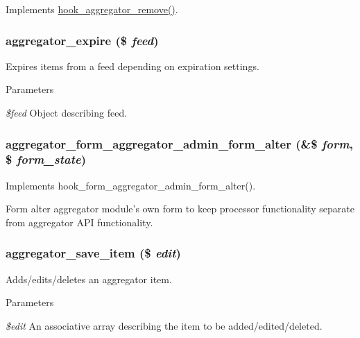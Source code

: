 \label{aggregator_8processor_8inc_a6e778e5eb28b433bc6f2cf8899984117}
Implements \hyperlink{group__hooks_gaf2f3e401371efb540b050208df5400eb}{hook\_\-aggregator\_\-remove()}. \hypertarget{aggregator_8processor_8inc_a09415d645937cbfa93210e3ead048c95}{
\subsubsection[{aggregator\_\-expire}]{\setlength{\rightskip}{0pt plus 5cm}aggregator\_\-expire (\$ {\em feed})}}
\label{aggregator_8processor_8inc_a09415d645937cbfa93210e3ead048c95}
Expires items from a feed depending on expiration settings.


\begin{DoxyParams}{Parameters}
\item[{\em \$feed}]Object describing feed. \end{DoxyParams}
\hypertarget{aggregator_8processor_8inc_afe5142db83732a99329131faa707c216}{
\subsubsection[{aggregator\_\-form\_\-aggregator\_\-admin\_\-form\_\-alter}]{\setlength{\rightskip}{0pt plus 5cm}aggregator\_\-form\_\-aggregator\_\-admin\_\-form\_\-alter (\&\$ {\em form}, \/  \$ {\em form\_\-state})}}
\label{aggregator_8processor_8inc_afe5142db83732a99329131faa707c216}
Implements hook\_\-form\_\-aggregator\_\-admin\_\-form\_\-alter().

Form alter aggregator module's own form to keep processor functionality separate from aggregator API functionality. \hypertarget{aggregator_8processor_8inc_af2c2210d5c5da020679c2d78a161022d}{
\subsubsection[{aggregator\_\-save\_\-item}]{\setlength{\rightskip}{0pt plus 5cm}aggregator\_\-save\_\-item (\$ {\em edit})}}
\label{aggregator_8processor_8inc_af2c2210d5c5da020679c2d78a161022d}
Adds/edits/deletes an aggregator item.


\begin{DoxyParams}{Parameters}
\item[{\em \$edit}]An associative array describing the item to be added/edited/deleted. \end{DoxyParams}
